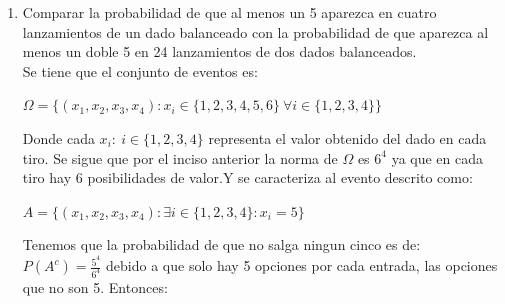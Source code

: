 \documentclass[12pt,a4paper]{report}
\begin{document}
\begin{enumerate}
{\begin{enumerate}[label=\alph*) ]
{\begin{center}
\end{center}
Y la probabilidad es entonces:\\
\begin{center}
$P(A)=\frac{||A||}{||\Omega||}=\frac{21}{216}$
\end{center}
De forma análoga se tiene que el evento B es:\\
\begin{center}
$B= \lbrace (x_{1},x_{2},x_{3}) : \sum\limits_{i=1}^{3} x_{i}=9 \rbrace$
\end{center}
Y que:\\
\begin{center}
$9=6+2+1=5+3+1=4+4+1=3+3+3=2+4+3=5+2+2$
\end{center}
Y la terna (3,3,3) tiene una unica forma de representarse por lo tanto:\\
\begin{center}
$||B||= 6(3!)-3-5-3=36-11=25$
\end{center}
Se le resta -3 a las ternas con dos elementos iguales y -5 a la terna con todos sus elementos iguales por lo tanto la probabilidad de B es:\\
\begin{center}
$P(B)=\frac{||B||}{||\Omega||}=\frac{25}{216}$
\end{center}
    }
    \item{Comparar la probabilidad de que al menos un 5 aparezca en cuatro lanzamientos de un dado balanceado con la probabilidad de que aparezca al menos un doble 5 en 24 lanzamientos de dos dados balanceados.\\
    Se tiene que el conjunto de eventos es:\\
    \begin{center}
    $\Omega = \lbrace (x_{1},x_{2},x_{3},x_{4}): x_{i}\in \lbrace 1,2,3,4,5,6 \rbrace \ \forall i\in \lbrace 1,2,3,4 \rbrace \rbrace$
    \end{center}
    Donde cada $x_{i}: \ i\in \lbrace 1,2,3,4 \rbrace$ representa el valor obtenido del dado en cada tiro. Se sigue que por el inciso anterior la norma de $\Omega$ es $6^4$ ya que en cada tiro hay 6 posibilidades de valor.Y se caracteriza al evento descrito como:\\
    \begin{center}
    $A= \lbrace (x_{1},x_{2},x_{3},x_{4}): \exists i\in \lbrace 1,2,3,4 \rbrace : x_{i}=5 \rbrace$
    \end{center}
Tenemos que la probabilidad de que no salga ningun cinco es de: $P(A^c)=\frac{5^4}{6^4}$ debido a que solo hay 5 opciones por cada entrada, las opciones que no son 5. Entonces:\\
}
\end{enumerate}}
\end{enumerate}
\end{document}
